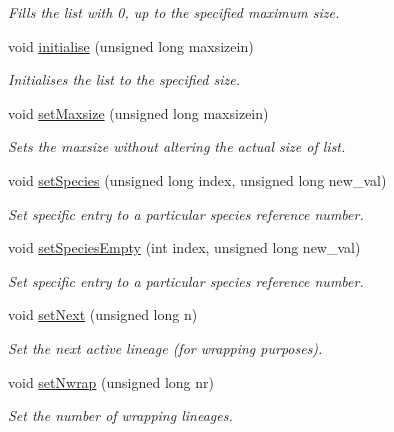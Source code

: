 \begin{DoxyCompactItemize}
\begin{DoxyCompactList}\small\item\em Fills the list with 0, up to the specified maximum size. \end{DoxyCompactList}\item 
void \hyperlink{class_species_list_ab36fdc058217514e66e6152479dfab8d}{initialise} (unsigned long maxsizein)
\begin{DoxyCompactList}\small\item\em Initialises the list to the specified size. \end{DoxyCompactList}\item 
void \hyperlink{class_species_list_a8532bddc8397cf50531639c50cccbef3}{set\+Maxsize} (unsigned long maxsizein)
\begin{DoxyCompactList}\small\item\em Sets the maxsize without altering the actual size of list. \end{DoxyCompactList}\item 
void \hyperlink{class_species_list_a98f19fa65ed7cbe4536342ce2dff2b7b}{set\+Species} (unsigned long index, unsigned long new\+\_\+val)
\begin{DoxyCompactList}\small\item\em Set specific entry to a particular species reference number. \end{DoxyCompactList}\item 
void \hyperlink{class_species_list_ae4b1baaacea721479c8585d36b475c96}{set\+Species\+Empty} (int index, unsigned long new\+\_\+val)
\begin{DoxyCompactList}\small\item\em Set specific entry to a particular species reference number. \end{DoxyCompactList}\item 
void \hyperlink{class_species_list_a627f9d95948f4a2cb6cfb3d8b8f9f2ea}{set\+Next} (unsigned long n)
\begin{DoxyCompactList}\small\item\em Set the next active lineage (for wrapping purposes). \end{DoxyCompactList}\item 
void \hyperlink{class_species_list_ad3f8f91e3983b8829c0b405013b2709e}{set\+Nwrap} (unsigned long nr)
\begin{DoxyCompactList}\small\item\em Set the number of wrapping lineages. \end{DoxyCompactList}\item 

\end{DoxyCompactItemize}
